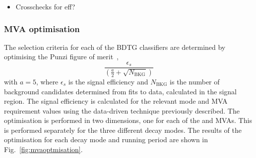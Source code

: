 {\color{Red}
\begin{itemize}
\item Crosschecks for eff?
\end{itemize}
}

\subsubsection{MVA optimisation}

The selection criteria for each of the BDTG classifiers are determined by optimising the Punzi figure of merit~\cite{Punzi:2003bu}, 
\begin{equation}
\frac{\epsilon_{s}}{(\frac{a}{2} + \sqrt{N_{\text{BKG}}})}
\end{equation}
with $a=5$, where $\epsilon_{s}$ is the signal efficiency and $N_{\text{BKG}}$ is the number of background candidates determined from fits to data, calculated in the signal region. 
The signal efficiency is calculated for the relevant mode and MVA requirement values using the data-driven technique previously described. 
The optimisation is performed in two dimensions, one for each of the \phiz and \Dsp MVAs. This is performed separately for the three different \Dsp decay modes. The results of the optimisation for each \Dsp decay mode and running period are shown in Fig.~\ref{fig:mvaoptmisation}. 

